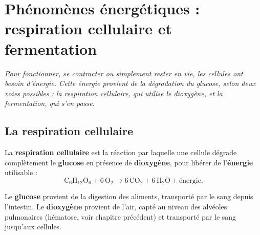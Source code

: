 \chapter{Phénomènes énergétiques : respiration cellulaire et fermentation}

\noindent\textit{Pour fonctionner, se contracter ou simplement rester en vie, les cellules
ont besoin d'énergie. Cette énergie provient de la dégradation du glucose, selon deux voies
possibles : la respiration cellulaire, qui utilise le dioxygène, et la fermentation, qui
s'en passe.}
\vspace{8pt}

\connecteBanner

\section{La respiration cellulaire}

\begin{definition}
La \textbf{respiration cellulaire} est la réaction par laquelle une cellule dégrade
complètement le \textbf{glucose} en présence de \textbf{dioxygène}, pour libérer de
l'\textbf{énergie} utilisable :
\[
\mathrm{C_6H_{12}O_6 + 6\,O_2 \longrightarrow 6\,CO_2 + 6\,H_2O + \text{énergie}}.
\]
\end{definition}

\begin{propriete}
Le \textbf{glucose} provient de la digestion des aliments, transporté par le sang depuis
l'intestin. Le \textbf{dioxygène} provient de l'air, capté au niveau des alvéoles
pulmonaires (hématose, voir chapitre précédent) et transporté par le sang jusqu'aux
cellules.
\end{propriete}

\begin{illus}
\end{illus}

